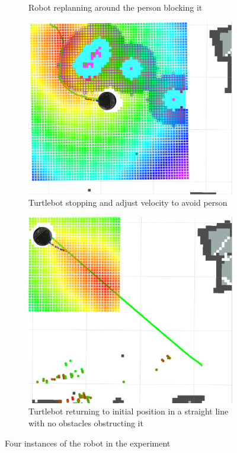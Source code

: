 \begin{figure}[ht!]
\begin{subfigure}[b]{0.49\linewidth}
    \caption{Robot replanning around the person blocking it}
    \label{fig::radarperson2}
  \end{subfigure}
  \begin{subfigure}[b]{0.49\linewidth}
    \includegraphics[width=\linewidth]{imgs/chapter5/radarperson3.png}
    \caption{Turtlebot stopping and adjust velocity to avoid person}
    \label{fig::radarperson3}
  \end{subfigure}
  \begin{subfigure}[b]{0.49\linewidth}
    \includegraphics[width=\linewidth]{imgs/chapter5/radarperson4.png}
    \caption{Turtlebot returning to initial position in a straight line with no obstacles obstructing it}
    \label{fig::radarperson4}
  \end{subfigure}
  \caption{Four instances of the robot in the experiment}
\end{figure}
